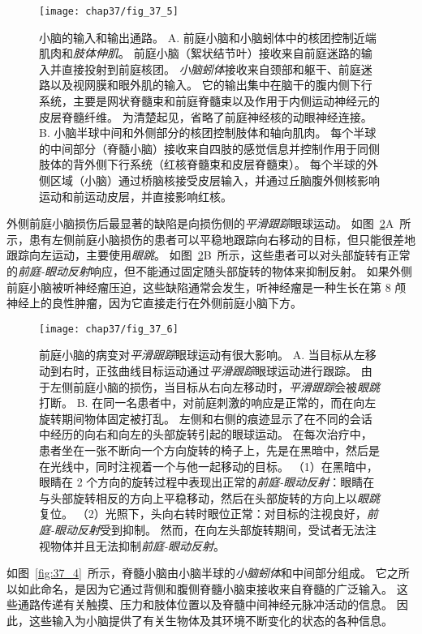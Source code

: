 \begin{figure}[htbp]
	\centering
	\texttt{[image: chap37/fig\_37\_5]}
	\caption{小脑的输入和输出通路。
		A. 前庭小脑和小脑蚓体中的核团控制近端肌肉和\textit{肢体伸肌}。
		前庭小脑（絮状结节叶）接收来自前庭迷路的输入并直接投射到前庭核团。
		\textit{小脑蚓体}接收来自颈部和躯干、前庭迷路以及视网膜和眼外肌的输入。
		它的输出集中在脑干的腹内侧下行系统，主要是网状脊髓束和前庭脊髓束以及作用于内侧运动神经元的皮层脊髓纤维。
		为清楚起见，省略了前庭神经核的动眼神经连接。
		B. 小脑半球中间和外侧部分的核团控制肢体和轴向肌肉。
		每个半球的中间部分（脊髓小脑）接收来自四肢的感觉信息并控制作用于同侧肢体的背外侧下行系统（红核脊髓束和皮层脊髓束）。
		每个半球的外侧区域（小脑）通过桥脑核接受皮层输入，并通过丘脑腹外侧核影响运动和前运动皮层，并直接影响红核。}
	\label{fig:37_5}
\end{figure}


外侧前庭小脑损伤后最显著的缺陷是向损伤侧的\textit{平滑跟踪}眼球运动。
如图~\ref{fig:37_6}A~所示，患有左侧前庭小脑损伤的患者可以平稳地跟踪向右移动的目标，但只能很差地跟踪向左运动，主要使用\textit{眼跳}。
如图~\ref{fig:37_6}B~所示，这些患者可以对头部旋转有正常的\textit{前庭-眼动反射}响应，但不能通过固定随头部旋转的物体来抑制反射。
如果外侧前庭小脑被听神经瘤压迫，这些缺陷通常会发生，听神经瘤是一种生长在第 8 颅神经上的良性肿瘤，因为它直接走行在外侧前庭小脑下方。


\begin{figure}[htbp]
	\centering
	\texttt{[image: chap37/fig\_37\_6]}
	\caption{前庭小脑的病变对\textit{平滑跟踪}眼球运动有很大影响。
		A. 当目标从左移动到右时，正弦曲线目标运动通过\textit{平滑跟踪}眼球运动进行跟踪。
		由于左侧前庭小脑的损伤，当目标从右向左移动时，\textit{平滑跟踪}会被\textit{眼跳}打断。
		B. 在同一名患者中，对前庭刺激的响应是正常的，而在向左旋转期间物体固定被打乱。
		左侧和右侧的痕迹显示了在不同的会话中经历的向右和向左的头部旋转引起的眼球运动。
		在每次治疗中，患者坐在一张不断向一个方向旋转的椅子上，先是在黑暗中，然后是在光线中，同时注视着一个与他一起移动的目标。
		（1）在黑暗中，眼睛在 2 个方向的旋转过程中表现出正常的\textit{前庭-眼动反射}：眼睛在与头部旋转相反的方向上平稳移动，然后在头部旋转的方向上以\textit{眼跳}复位。
		（2）光照下，头向右转时眼位正常：对目标的注视良好，\textit{前庭-眼动反射}受到抑制。
		然而，在向左头部旋转期间，受试者无法注视物体并且无法抑制\textit{前庭-眼动反射}。}
	\label{fig:37_6}
\end{figure}


如图~\ref{fig:37_4}~所示，脊髓小脑由小脑半球的\textit{小脑蚓体}和中间部分组成。
它之所以如此命名，是因为它通过背侧和腹侧脊髓小脑束接收来自脊髓的广泛输入。
这些通路传递有关触摸、压力和肢体位置以及脊髓中间神经元脉冲活动的信息。
因此，这些输入为小脑提供了有关生物体及其环境不断变化的状态的各种信息。


